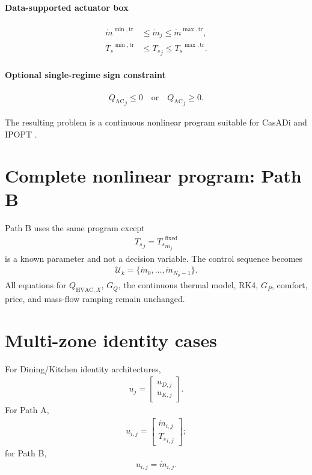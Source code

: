 \documentclass[11pt]{article}
\newcommand{\Ts}{T_s}
\newcommand{\mdot}{\dot m}
\newcommand{\QAC}{Q_{\mathrm{AC}}}
\newcommand{\QHX}{Q_{\mathrm{HVAC},X}}
\begin{document}
\paragraph{Data-supported actuator box}
\begin{align}
\mdot^{\min,\mathrm{tr}}
&\le\mdot_j\le\mdot^{\max,\mathrm{tr}},
\\
{\Ts}^{\min,\mathrm{tr}}
&\le{\Ts}_j\le{\Ts}^{\max,\mathrm{tr}}.
\tag{6.74}
\end{align}

\paragraph{Optional single-regime sign constraint}
\begin{align}
{\QAC}_j\le0
\quad\text{or}\quad
{\QAC}_j\ge0.
\tag{6.75}
\end{align}

The resulting problem is a continuous nonlinear program suitable for CasADi and IPOPT
\citep{andersson2019casadi,wachter2006ipopt}.

\section{Complete nonlinear program: Path B}

Path B uses the same program except
\begin{align}
{\Ts}_j
=
{\Ts}_{m_j}^{\mathrm{fixed}}
\end{align}
is a known parameter and not a decision variable.  The control sequence becomes
\begin{align}
\mathcal U_k
=
\{\mdot_0,\ldots,\mdot_{N_p-1}\}.
\tag{6.76}
\end{align}
All equations for \(\QHX\), \(G_Q\), the continuous thermal model, RK4, \(G_P\), comfort, price,
and mass-flow ramping remain unchanged.

\section{Multi-zone identity cases}

For Dining/Kitchen identity architectures,
\begin{align}
u_j
=
\begin{bmatrix}
u_{D,j}\\
u_{K,j}
\end{bmatrix}.
\tag{6.77}
\end{align}
For Path A,
\begin{align}
u_{i,j}
=
\begin{bmatrix}
\mdot_{i,j}\\
{\Ts}_{i,j}
\end{bmatrix};
\end{align}
for Path B,
\begin{align}
u_{i,j}=\mdot_{i,j}.
\end{align}
\end{document}
